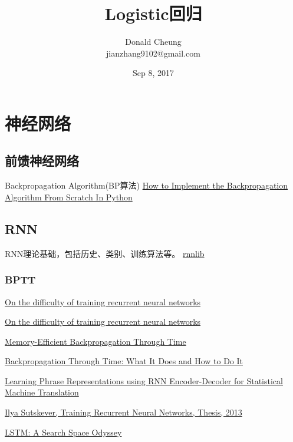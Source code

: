 \documentclass[10pt,a4paper]{ctexbook}
\begin{document}
    \setlength{\baselineskip}{20pt}
    \title{Logistic回归}
    \author{Donald Cheung\\jianzhang9102@gmail.com}
    \date{Sep 8, 2017}
    \maketitle
    \tableofcontents
\fi

\chapter{神经网络}
\section{前馈神经网络}
Backpropagation Algorithm(BP算法)
\href{https://machinelearningmastery.com/implement-backpropagation-algorithm-scratch-python/}{How to Implement the Backpropagation Algorithm From Scratch In Python}

\section{RNN}
RNN理论基础，包括历史、类别、训练算法等。
\href{https://github.com/szcom/rnnlib}{rnnlib}



\subsection{BPTT}
\href{http://proceedings.mlr.press/v28/pascanu13.pdf}{On the difficulty of training recurrent neural networks}

\href{https://arxiv.org/abs/1211.5063}{On the difficulty of training recurrent neural networks}

\href{https://arxiv.org/abs/1606.03401}{Memory-Efficient Backpropagation Through Time}

\href{http://axon.cs.byu.edu/~martinez/classes/678/Papers/Werbos_BPTT.pdf}{Backpropagation Through Time: What It Does and How to Do It}

\href{https://arxiv.org/pdf/1406.1078v3.pdf}{Learning Phrase Representations using RNN Encoder-Decoder for Statistical Machine Translation}

\href{http://www.cs.utoronto.ca/~ilya/pubs/ilya_sutskever_phd_thesis.pdf}{Ilya Sutskever, Training Recurrent Neural Networks, Thesis, 2013}

\href{https://arxiv.org/abs/1503.04069}{LSTM: A Search Space Odyssey}
\end{document}
